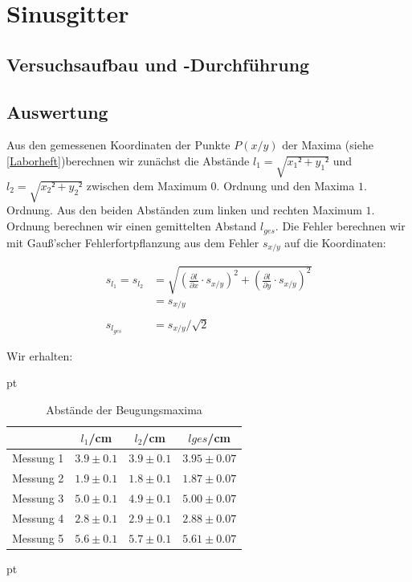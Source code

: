 \documentclass[12pt]{article}
\newcommand{\del}[2][]{\frac{\partial #1}{\partial #2}}
\begin{document}
\section{Sinusgitter}

\newpage
\subsection{Versuchsaufbau und -Durchführung}





\newpage
\subsection{Auswertung}

Aus den gemessenen Koordinaten der Punkte $P(x/y)$ der Maxima (siehe \ref{Laborheft})berechnen wir zunächst die Abstände $l_1 = \sqrt{x_1²+y_1²}$ und $l_2= \sqrt{x_2²+y_2²} $ zwischen dem Maximum $0.$ Ordnung und den Maxima $1.$ Ordnung. Aus den beiden Abständen zum linken und rechten Maximum $1.$ Ordnung berechnen wir einen gemittelten Abstand $l_{ges}$. Die Fehler berechnen wir mit Gauß'scher Fehlerfortpflanzung aus dem Fehler $s_{x/y}$ auf die Koordinaten:

\begin{align*}
s_{l_1} = s_{l_2} &= \sqrt{\left(\del[l]{x}\cdot s_{x/y}\right)^2+\left(\del[l]{y}\cdot s_{x/y}\right)^2}\\
&= s_{x/y}\\
\  \\
s_{l_{ges}} &= s_{x/y}/\sqrt{2}
\end{align*}

Wir erhalten:

  pt
 \begin{table}[h!]
 {\centering{}
\begin{tabular}{c||c|c|c}
 					& $l_1$/cm 	& $l_2$/cm & $l{ges}$/cm	\\ \hline\hline
Messung 1		& $3.9 \pm 0.1$ 	&  $3.9 \pm 0.1$    	&  $3.95 \pm 0.07$ \\ \hline 
Messung 2	&	 $1.9 \pm 0.1$ 	   	&  $1.8 \pm 0.1$  	&  $1.87 \pm 0.07$  \\ \hline
Messung 3      	&  $5.0 \pm 0.1$  	&  $4.9 \pm 0.1$  &  $5.00 \pm 0.07$  \\ \hline
Messung 4    & $2.8 \pm 0.1$ & $2.9 \pm 0.1$ &   $2.88 \pm 0.07$        \\ \hline                                           
Messung 5  & $5.6 \pm 0.1$  & $5.7 \pm 0.1$ & $5.61 \pm 0.07$
 \end{tabular}}
 \caption{Abstände der Beugungsmaxima}
\end{table}
 pt
\end{document}
